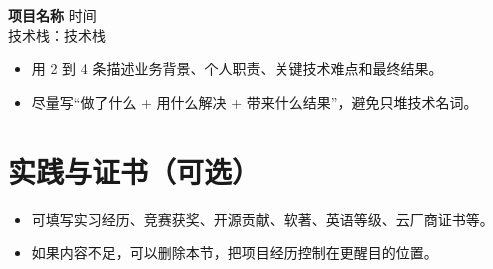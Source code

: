 \documentclass[11pt,a4paper]{ctexart}
\newcommand{\resumeItem}[1]{\item #1}
\newcommand{\projectHeading}[3]{
  \textbf{#1} \hfill #2 \\
  {\color{textgray}技术栈：#3}
}
\begin{document}
\projectHeading
  {项目名称}{时间}
  {技术栈}

\begin{itemize}
  \resumeItem{用 2 到 4 条描述业务背景、个人职责、关键技术难点和最终结果。}
  \resumeItem{尽量写“做了什么 + 用什么解决 + 带来什么结果”，避免只堆技术名词。}
\end{itemize}

\section{实践与证书（可选）}

\begin{itemize}
  \resumeItem{可填写实习经历、竞赛获奖、开源贡献、软著、英语等级、云厂商证书等。}
  \resumeItem{如果内容不足，可以删除本节，把项目经历控制在更醒目的位置。}
\end{itemize}
\end{document}
